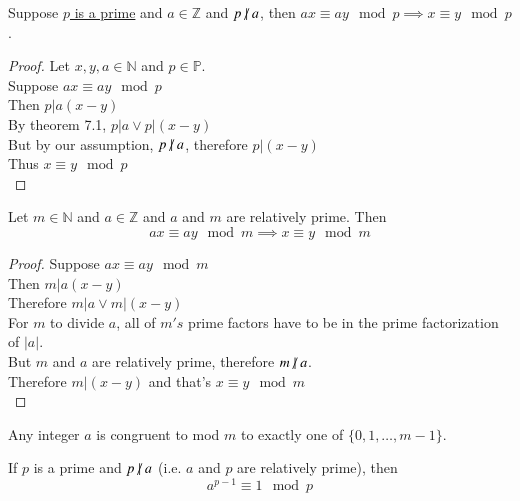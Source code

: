 \documentclass[11pt]{article}
\begin{document}
	\begin{theorem}
		Suppose \ul{$p$ is a prime} and $a \in \mathbb{Z}$ and $p \centernot | a$, then $ax \equiv ay \mod p \implies x \equiv y \mod p$.
	\end{theorem}
	
	\begin{proof}
		Let $x,y,a \in \mathbb{N}$ and $p \in \mathbb{P}$. \\
		Suppose $ax \equiv ay \mod p$ \\
		Then $p | a(x-y)$ \\
		By theorem 7.1, $p | a \lor p | (x-y)$\\
		But by our assumption, $p \centernot | a$, therefore $p | (x-y)$ \\
		Thus $x \equiv y \mod p$ \\
	\end{proof}
	
	\begin{theorem}
		Let $m \in \mathbb{N}$ and $a \in \mathbb{Z}$ and $a$ and $m$ are relatively prime. Then 
		\[
			ax \equiv ay \mod m \implies x \equiv y \mod m
		\]
	\end{theorem}
	
	\begin{proof}
		Suppose $ax \equiv ay \mod m$ \\
		Then $m | a(x-y)$ \\
		Therefore $m | a \lor m | (x - y)$ \\
		For $m$ to divide $a$, all of $m's$ prime factors have to be in the prime factorization of $|a|$. \\
		But $m$ and $a$ are relatively prime, therefore $m \centernot | a$. \\
		Therefore $m | (x-y)$ and that's $x \equiv y \mod m$\\
	\end{proof}
	
	\begin{theorem}
		Any integer $a$ is congruent to mod $m$ to exactly one of $\{0, 1, \dots, m-1\}$.
	\end{theorem}
	
	\begin{theorem}
		If $p$ is a prime and $p \centernot | a$ (i.e. $a$ and $p$ are relatively prime), then
		\[
			a^{p-1} \equiv 1 \mod p
		\]
	\end{theorem}
	
\end{document}
